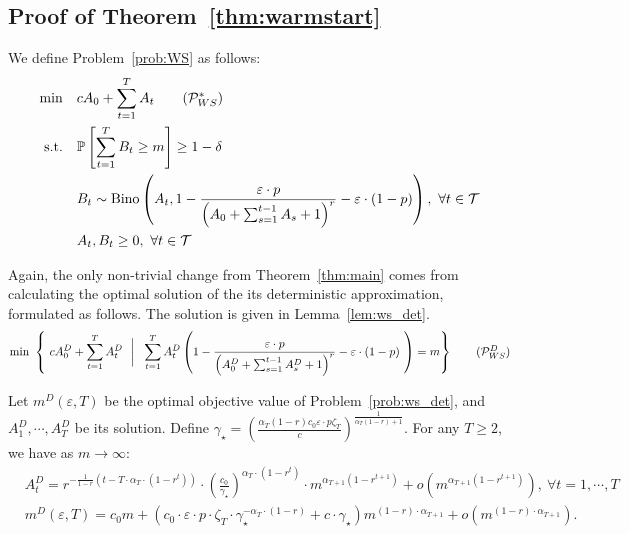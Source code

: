 \documentclass[nonblindrev]{informs3noheader}
\DeclareMathOperator\Bino{Bino}
\def\P{\mathbb{P}}
\def\calP{\mathcal{P}}
\def\calT{\mathcal{T}}
\def\st{\text{s.t.}}
\begin{document}
\subsection{Proof of Theorem~\ref{thm:warmstart}}
\label{app:warmstart}

We define Problem~\eqref{prob:WS} as follows:
		\begin{align}
		    \min\quad & cA_0+\sum_{t=1}^T A_t \label{prob:WS}\tag{$\calP^*_{WS}$}\\
		    \st\quad&\P\left[\sum_{t=1}^TB_t\geq m\right] \geq 1-\delta \nonumber\\
		    \quad& B_t\sim \Bino\left(A_t, 1- \frac{\varepsilon\cdot p}{\left(A_0+\sum_{s=1}^{t-1} A_s +1\right)^r}-\varepsilon\cdot(1-p)\right),\ \forall t\in\calT\nonumber\\
		    \quad& A_t,B_t\geq0,\ \forall t\in\calT\nonumber
		\end{align}

Again, the only non-trivial change from Theorem~\ref{thm:main} comes from calculating the optimal solution of the its deterministic approximation, formulated as follows. The solution is given in Lemma~\ref{lem:ws_det}.
{\small\begin{align}
    		    \min\ \left\{\ cA^D_0+ \sum_{t=1}^T A^{D}_t \ \ \bigg|\ \ \sum_{t=1}^TA^{D}_t \left(1- \frac{\varepsilon\cdot p}{\left(A^D_0+\sum_{s=1}^{t-1} A^D_s +1\right)^r}-\varepsilon\cdot(1-p)\ \right)=m\right\} \label{prob:ws_det} \tag{$\calP^{D}_{WS}$}
		\end{align}}

\begin{lemma}\label{lem:ws_det}
Let $m^D(\varepsilon, T)$ be the optimal objective value of Problem~\eqref{prob:ws_det}, and $A^{D}_1,\cdots, A^{D}_T$ be its solution. Define $\gamma_\star=\left(\frac{\alpha_T(1-r)c_0\varepsilon\cdot p \zeta_T}{c}\right)^{\frac{1}{\alpha_T(1-r)+1}}$. For any $T\geq 2$, we have as $m \to \infty$: 
\begin{align*}
       & A^{D}_t = r^{-\frac{1}{1-r}\left(t-T\cdot\alpha_T\cdot(1-r^t)\right)}\cdot \left(\frac{c_0}{\gamma_\star}\right)^{\alpha_T\cdot(1-r^t)}\cdot m^{\alpha_{T+1}(1-r^{t+1})}+ o\left(m^{\alpha_{T+1}(1-r^{t+1})}\right),\ \forall t=1,\cdots,T\\
       &m^D(\varepsilon, T) = c_0m+\left(c_0\cdot\varepsilon\cdot p\cdot\zeta_T\cdot \gamma_\star^{-\alpha_T\cdot(1-r)}+c\cdot\gamma_\star\right)m^{(1-r)\cdot\alpha_{T+1}}+ o\left(m^{(1-r)\cdot\alpha_{T+1}}\right).
\end{align*}
\end{lemma}
\end{document}
